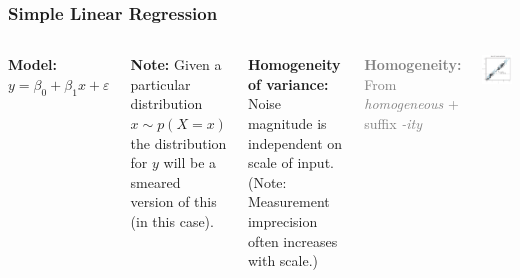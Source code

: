 \documentclass[usenames,dvipsnames,table]{beamer}
\begin{document}
\begin{frame}
\frametitle{Simple Linear Regression}
\begin{columns}
\textbf{Model:} $y = \beta_0 + \beta_1 x + \varepsilon$

\vspace{1em}
\textbf{Note:} Given a particular distribution $x \sim p(X=x)$ the distribution for $y$ will be a smeared version of this (in this case).

\vspace{1em}
\textbf{Homogeneity of variance:} Noise magnitude is independent on scale of input. (Note: Measurement imprecision often increases with scale.)

\vspace{1em}
\textcolor{gray}{\textbf{Homogeneity:} From \emph{homogeneous} + suffix \emph{-ity}}

\includegraphics[width=\textwidth]{img/fig17_1}
\end{columns}
\end{frame}
\end{document}
